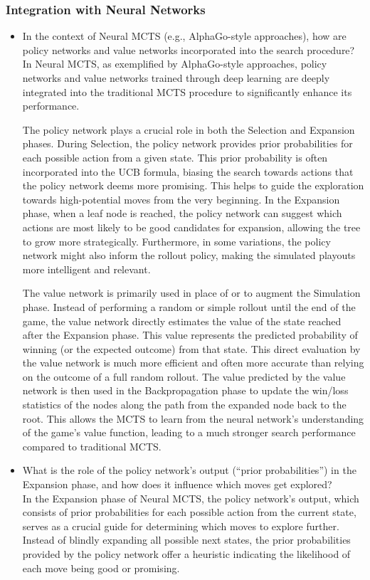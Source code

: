 \subsubsection{Integration with Neural Networks}
\begin{itemize}
    \item In the context of Neural MCTS (e.g., AlphaGo-style approaches), how are policy networks and value networks incorporated into the search procedure?  
    \\
    In Neural MCTS, as exemplified by AlphaGo-style approaches, policy networks and value networks trained through deep learning are deeply integrated into the traditional MCTS procedure to significantly enhance its performance.

The policy network plays a crucial role in both the Selection and Expansion phases. During Selection, the policy network provides prior probabilities for each possible action from a given state. This prior probability is often incorporated into the UCB formula, biasing the search towards actions that the policy network deems more promising. This helps to guide the exploration towards high-potential moves from the very beginning. In the Expansion phase, when a leaf node is reached, the policy network can suggest which actions are most likely to be good candidates for expansion, allowing the tree to grow more strategically. Furthermore, in some variations, the policy network might also inform the rollout policy, making the simulated playouts more intelligent and relevant.

The value network is primarily used in place of or to augment the Simulation phase. Instead of performing a random or simple rollout until the end of the game, the value network directly estimates the value of the state reached after the Expansion phase. This value represents the predicted probability of winning (or the expected outcome) from that state. This direct evaluation by the value network is much more efficient and often more accurate than relying on the outcome of a full random rollout. The value predicted by the value network is then used in the Backpropagation phase to update the win/loss statistics of the nodes along the path from the expanded node back to the root. This allows the MCTS to learn from the neural network's understanding of the game's value function, leading to a much stronger search performance compared to traditional MCTS.
    \item What is the role of the policy network’s output (“prior probabilities”) in the Expansion phase, and how does it influence which moves get explored?
    \\
    In the Expansion phase of Neural MCTS, the policy network's output, which consists of prior probabilities for each possible action from the current state, serves as a crucial guide for determining which moves to explore further. Instead of blindly expanding all possible next states, the prior probabilities provided by the policy network offer a heuristic indicating the likelihood of each move being good or promising.


\end{itemize}
